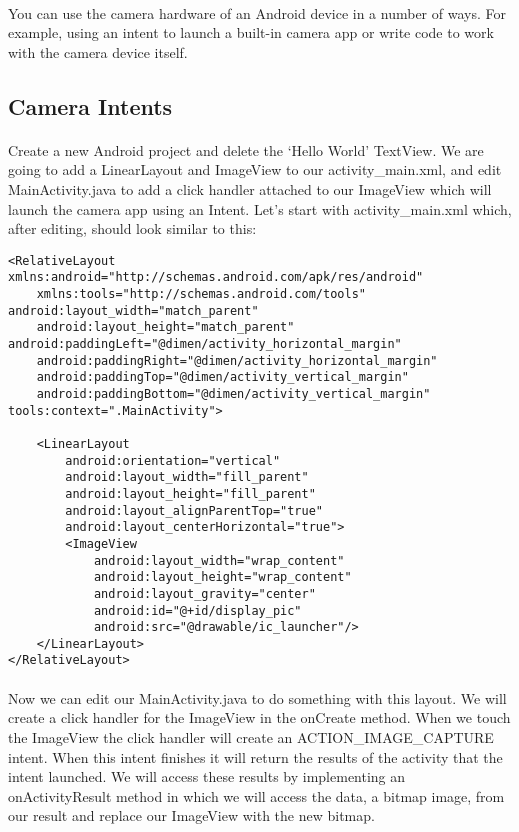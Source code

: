 \paragraph{} You can use the camera hardware of an Android device in a number of ways. For example, using an intent to launch a built-in camera app or write code to work with the camera device itself.

\subsection{Camera Intents}
\paragraph{} Create a new Android project and delete the `Hello World' TextView. We are going to add a LinearLayout and ImageView to our activity\_main.xml, and edit MainActivity.java to add a click handler attached to our ImageView which will launch the camera app using an Intent. Let's start with activity\_main.xml which, after editing, should look similar to this:

\begin{lstlisting}
<RelativeLayout xmlns:android="http://schemas.android.com/apk/res/android"
    xmlns:tools="http://schemas.android.com/tools" android:layout_width="match_parent"
    android:layout_height="match_parent" android:paddingLeft="@dimen/activity_horizontal_margin"
    android:paddingRight="@dimen/activity_horizontal_margin"
    android:paddingTop="@dimen/activity_vertical_margin"
    android:paddingBottom="@dimen/activity_vertical_margin" tools:context=".MainActivity">

    <LinearLayout
        android:orientation="vertical"
        android:layout_width="fill_parent"
        android:layout_height="fill_parent"
        android:layout_alignParentTop="true"
        android:layout_centerHorizontal="true">
        <ImageView
            android:layout_width="wrap_content"
            android:layout_height="wrap_content"
            android:layout_gravity="center"
            android:id="@+id/display_pic"
            android:src="@drawable/ic_launcher"/>
    </LinearLayout>
</RelativeLayout>
\end{lstlisting}

\paragraph{} Now we can edit our MainActivity.java to do something with this layout. We will create a click handler for the ImageView in the onCreate method. When we touch the ImageView the click handler will create an ACTION\_IMAGE\_CAPTURE intent. When this intent finishes it will return the results of the activity that the intent launched. We will access these results by implementing an onActivityResult method in which we will access the data, a bitmap image, from our result and replace our ImageView with the new bitmap.

